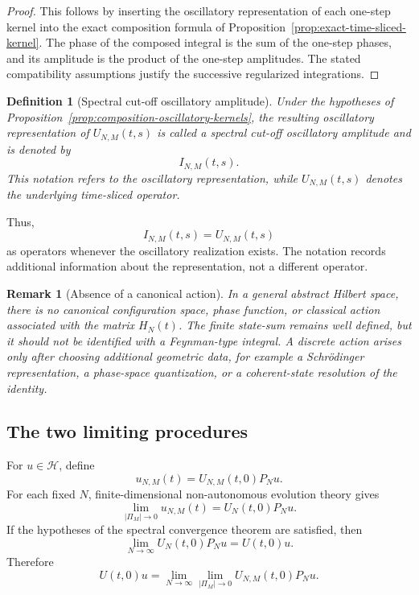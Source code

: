 \documentclass[10pt,a4paper]{amsart}
\newtheorem{definition}[theorem]{Definition}
\newtheorem{remark}[theorem]{Remark}
\begin{document}
\begin{proof}
This follows by inserting the oscillatory representation of each one-step
kernel into the exact composition formula of
Proposition~\ref{prop:exact-time-sliced-kernel}. The phase of the composed
integral is the sum of the one-step phases, and its amplitude is the product
of the one-step amplitudes. The stated compatibility assumptions justify the
successive regularized integrations.
\end{proof}

\begin{definition}[Spectral cut-off oscillatory amplitude]
\label{def:spectral-cutoff-oscillatory-amplitude}
Under the hypotheses of
Proposition~\ref{prop:composition-oscillatory-kernels}, the resulting
oscillatory representation of \(U_{N,M}(t,s)\) is called a spectral cut-off
oscillatory amplitude and is denoted by
\[
I_{N,M}(t,s).
\]
This notation refers to the oscillatory representation, while
\(U_{N,M}(t,s)\) denotes the underlying time-sliced operator.
\end{definition}

Thus,
\[
I_{N,M}(t,s)=U_{N,M}(t,s)
\]
as operators whenever the oscillatory realization exists. The notation
records additional information about the representation, not a different
operator.

\begin{remark}[Absence of a canonical action]
\label{rem:no-canonical-action}
In a general abstract Hilbert space, there is no canonical configuration
space, phase function, or classical action associated with the matrix
\(H_{N}(t)\). The finite state-sum remains well defined, but it should not be
identified with a Feynman-type integral. A discrete action arises only after
choosing additional geometric data, for example a Schrödinger
representation, a phase-space quantization, or a coherent-state resolution
of the identity.
\end{remark}


\subsection{The two limiting procedures}
\label{subsec:two-limiting-procedures}

For \(u\in\mathcal{H}\), define
\[
u_{N,M}(t)
=
U_{N,M}(t,0)P_{N}u.
\]
For each fixed \(N\), finite-dimensional non-autonomous evolution theory gives
\[
\lim_{|\Pi_{M}|\to 0}
u_{N,M}(t)
=
U_{N}(t,0)P_{N}u.
\]
If the hypotheses of the spectral convergence theorem are satisfied, then
\[
\lim_{N\to\infty}
U_{N}(t,0)P_{N}u
=
U(t,0)u.
\]
Therefore
\[
U(t,0)u
=
\lim_{N\to\infty}
\lim_{|\Pi_{M}|\to 0}
U_{N,M}(t,0)P_{N}u.
\]
\end{document}
